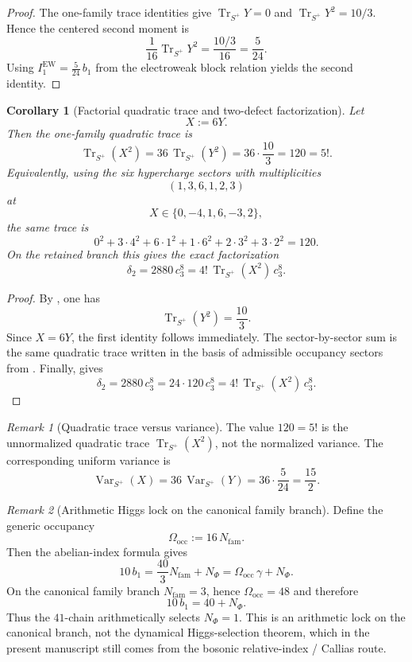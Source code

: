 \documentclass[11pt,a4paper]{article}
\newtheorem{corollary}[theorem]{Corollary}
\theoremstyle{definition}
\theoremstyle{remark}
\newtheorem*{remark}{Remark}
\DeclareMathOperator{\tr}{Tr}
\newcommand{\cthree}{c_3}
\newcommand{\bone}{b_1}
\begin{document}
\begin{proof}
The one-family trace identities give $\tr_{S^+}Y=0$ and $\tr_{S^+}Y^2=10/3$. Hence the centered second moment is
\[
\frac{1}{16}\tr_{S^+}Y^2=\frac{10/3}{16}=\frac{5}{24}.
\]
Using $I_1^{\mathrm{EW}}=\frac{5}{24}\,\bone$ from the electroweak block relation yields the second identity.
\end{proof}

\begin{corollary}[Factorial quadratic trace and two-defect factorization]
\label{cor:factorial-trace-delta2}
Let
\[
X:=6Y.
\]
Then the one-family quadratic trace is
\[
\tr_{S^+}(X^2)
=
36\,\tr_{S^+}(Y^2)
=
36\cdot\frac{10}{3}
=
120
=
5!.
\]
Equivalently, using the six hypercharge sectors with multiplicities
\[
(1,3,6,1,2,3)
\]
at
\[
X\in\{0,-4,1,6,-3,2\},
\]
the same trace is
\[
0^2+3\cdot 4^2+6\cdot 1^2+1\cdot 6^2+2\cdot 3^2+3\cdot 2^2=120.
\]
On the retained branch this gives the exact factorization
\[
\delta_2
=
2880\,\cthree^8
=
4!\,\tr_{S^+}(X^2)\,\cthree^8.
\]
\end{corollary}

\begin{proof}
By , one has
\[
\tr_{S^+}(Y^2)=\frac{10}{3}.
\]
Since $X=6Y$, the first identity follows immediately. The sector-by-sector sum is the same quadratic trace written in the basis of admissible occupancy sectors from . Finally,  gives
\[
\delta_2=2880\,\cthree^8=24\cdot 120\,\cthree^8
=
4!\,\tr_{S^+}(X^2)\,\cthree^8.
\]
\end{proof}

\begin{remark}[Quadratic trace versus variance]
The value $120=5!$ is the unnormalized quadratic trace $\tr_{S^+}(X^2)$, not the normalized variance. The corresponding uniform variance is
\[
\operatorname{Var}_{S^+}(X)=36\,\operatorname{Var}_{S^+}(Y)=36\cdot\frac{5}{24}=\frac{15}{2}.
\]
\end{remark}

\begin{remark}[Arithmetic Higgs lock on the canonical family branch]
Define the generic occupancy
\[
\Omega_{\mathrm{occ}}:=16\,N_{\mathrm{fam}}.
\]
Then the abelian-index formula gives
\[
10\,\bone
=
\frac{40}{3}N_{\mathrm{fam}}+N_\Phi
=
\Omega_{\mathrm{occ}}\,\gamma+N_\Phi.
\]
On the canonical family branch $N_{\mathrm{fam}}=3$, hence $\Omega_{\mathrm{occ}}=48$ and therefore
\[
10\,\bone=40+N_\Phi.
\]
Thus the $41$-chain arithmetically selects $N_\Phi=1$. This is an arithmetic lock on the canonical branch, not the dynamical Higgs-selection theorem, which in the present manuscript still comes from the bosonic relative-index / Callias route.
\end{remark}
\end{document}
